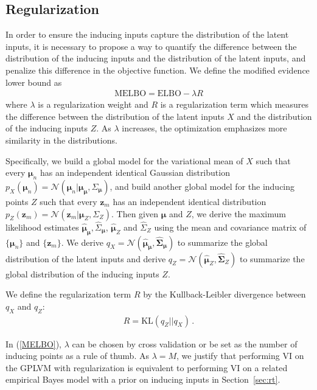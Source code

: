 \documentclass{article}
\begin{document}
\subsection{Regularization} \label{sec:r}
In order to ensure the inducing inputs capture the distribution of the latent inputs, it is necessary to propose a way to quantify the difference between the distribution of the inducing inputs and the distribution of the latent inputs, and penalize this difference in the objective function. We define the modified evidence lower bound as
\begin{eqnarray}
\mathrm{MELBO} = \mathrm{ELBO} - \lambda R
\label{MELBO}
\end{eqnarray} 
where $\lambda$ is a regularization weight and $R$ is a regularization term which measures the difference between the distribution of the latent inputs $X$ and the distribution of the inducing inputs $Z$. As $\lambda$ increases, the optimization emphasizes more similarity in the distributions.

Specifically, we build a global model for the variational mean of $X$ such that every $\bm \mu_n$ has an independent identical Gaussian distribution $p_X(\bm \mu_n) = \mathcal{N}(\bm \mu_n| \bm \mu_{\bm \mu}, \Sigma_{\bm \mu})$, and build another global model for the inducing points $Z$ such that every $\bm z_m$ has an independent identical distribution $p_Z(\bm z_m) = \mathcal{N}(\bm z_m| \bm \mu_Z, \Sigma_Z)$. Then given $\bm \mu$ and $Z$, we derive the maximum likelihood estimates $\hat{\bm\mu}_{\bm \mu}, \hat{\Sigma}_{\bm \mu}$, $\hat{\bm \mu}_Z$ and $\hat{\Sigma}_Z$ using the mean and covariance matrix of $\{\bm \mu_n\}$ and $\{\bm z_m\}$. We derive $q_X = \mathcal{N}(\hat{\bm\mu}_{\bm\mu}, \hat{\bm\Sigma}_{\bm \mu})$ to summarize the global distribution of the latent inputs and derive
$q_Z = \mathcal{N}(\hat{\bm\mu}_Z, \hat{\bm\Sigma}_Z)$ to summarize the global distribution of the inducing inputs $Z$.

We define the regularization term $R$ by the Kullback-Leibler divergence between $q_X$ and $q_Z$:
\begin{eqnarray}
R = \mathrm{KL}(q_Z||q_X)\,.
\end{eqnarray}

In (\ref{MELBO}), $\lambda$ can be chosen by cross validation or be set as the number of inducing points as a rule of thumb. As $\lambda = M$, we justify that performing VI on the GPLVM with regularization is equivalent to performing VI on a related empirical Bayes model with a prior on inducing inputs in Section~\ref{sec:rt}.
\end{document}
